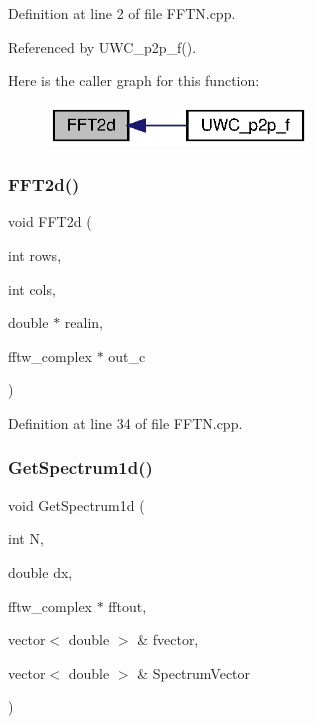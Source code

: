 Definition at line 2 of file F\+F\+T\+N.\+cpp.



Referenced by U\+W\+C\+\_\+p2p\+\_\+f().

Here is the caller graph for this function\+:\nopagebreak
\begin{figure}[H]
\begin{center}
\leavevmode
\includegraphics[width=196pt]{FFTN_8cpp_a9c926bdffb37048d2b93b1cadfbf11e7_a9c926bdffb37048d2b93b1cadfbf11e7_icgraph}
\end{center}
\end{figure}
\mbox{\label{FFTN_8cpp_af12eeba48614558162aef2c001d16139_af12eeba48614558162aef2c001d16139}} 
\subsubsection{F\+F\+T2d()\hspace{0.1cm}{\footnotesize\ttfamily [2/2]}}
{\footnotesize\ttfamily void F\+F\+T2d (\begin{DoxyParamCaption}\item[{int}]{rows,  }\item[{int}]{cols,  }\item[{double $\ast$}]{realin,  }\item[{fftw\+\_\+complex $\ast$}]{out\+\_\+c }\end{DoxyParamCaption})}



Definition at line 34 of file F\+F\+T\+N.\+cpp.

\mbox{\label{FFTN_8cpp_ad995b45ac5f0cf6940a4be9e90d3a380_ad995b45ac5f0cf6940a4be9e90d3a380}} 
\subsubsection{Get\+Spectrum1d()}
{\footnotesize\ttfamily void Get\+Spectrum1d (\begin{DoxyParamCaption}\item[{int}]{N,  }\item[{double}]{dx,  }\item[{fftw\+\_\+complex $\ast$}]{fftout,  }\item[{vector$<$ double $>$ \&}]{fvector,  }\item[{vector$<$ double $>$ \&}]{Spectrum\+Vector }\end{DoxyParamCaption})}



